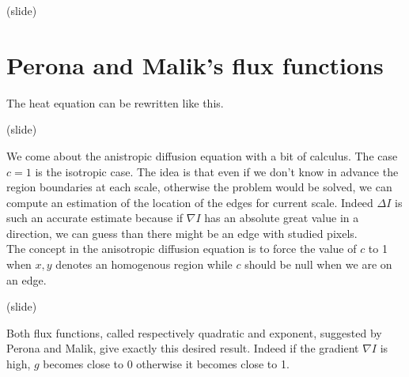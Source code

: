 \documentclass{article}
\begin{document}
(slide)

\section{Perona and Malik's flux functions}


The heat equation can be rewritten like this.%

(slide)

We come about the anistropic diffusion equation with a bit of calculus.%
The case $c=1$ is the isotropic case. The idea is that even if we don't know in advance the region boundaries at each scale, otherwise the problem would be solved, we can compute an estimation of the location of the edges for current scale. Indeed $\Delta I$ is such an accurate estimate because if $\nabla I$ has an absolute great value in a direction, we can guess than there might be an edge with studied pixels.\\
The concept in the anisotropic diffusion equation is to force the value of $c$ to 1 when $x, y$ denotes an homogenous region while $c$ should be null when we are on an edge.

(slide)

Both flux functions, called respectively quadratic and exponent, suggested by Perona and Malik, give exactly this desired result. Indeed if the gradient $\nabla I$ is high, $g$ becomes close to 0 otherwise it becomes close to 1.%

\end{document}
